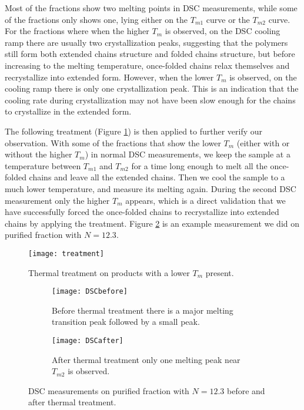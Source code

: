 Most of the fractions show two melting points in DSC measurements, while some of the fractions only shows one, lying either on the $T_{m1}$ curve or the $T_{m2}$ curve. For the fractions where when the higher $T_{m}$ is observed, on the DSC cooling ramp there are usually two crystallization peaks, suggesting that the polymers still form both extended chains structure and folded chains structure, but before increasing to the melting temperature, once-folded chains relax themselves and recrystallize into extended form. However, when the lower $T_{m}$ is observed, on the cooling ramp there is only one crystallization peak. This is an indication that the cooling rate during crystallization may not have been slow enough for the chains to crystallize in the extended form.

The following treatment (Figure \ref{fig:treatment}) is then applied to further verify our observation. With some of the fractions that show the lower $T_{m}$ (either with or without the higher $T_{m}$) in normal DSC measurements, we keep the sample at a temperature between $T_{m1}$ and $T_{m2}$ for a time long enough to melt all the once-folded chains and leave all the extended chains. Then we cool the sample to a much lower temperature, and measure its melting again. During the second DSC measurement only the higher $T_{m}$ appears, which is a direct validation that we have successfully forced the once-folded chains to recrystallize into extended chains by applying the treatment. Figure \ref{fig:DSC before and after} is an example measurement we did on purified fraction with $N = 12.3$.

\begin{figure}[H]
\center
\texttt{[image: treatment]}
\caption{Thermal treatment on products with a lower $T_{m}$ present.}
\label{fig:treatment}
\end{figure}

\begin{figure}[H]
	\centering
\begin{subfigure}[b]{0.6\linewidth}
	\texttt{[image: DSCbefore]}
	\caption{Before thermal treatment there is a major melting transition peak followed by a small peak.}
\end{subfigure}
\begin{subfigure}[b]{0.6\linewidth}
	\texttt{[image: DSCafter]}
	\caption{After thermal treatment only one melting peak near $T_{m2}$ is observed.}
\end{subfigure}
\caption{DSC measurements on purified fraction with $N = 12.3$ before and after thermal treatment.}
\label{fig:DSC before and after}
\end{figure}

